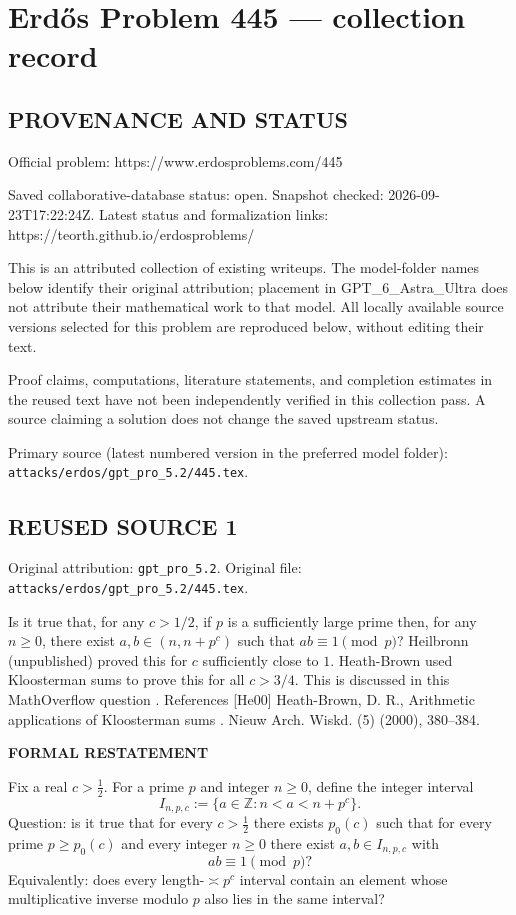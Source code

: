\section*{Erd\H{o}s Problem 445 --- collection record}

\subsection*{PROVENANCE AND STATUS}
Official problem: https://www.erdosproblems.com/445

Saved collaborative-database status: open.
Snapshot checked: 2026-09-23T17:22:24Z.
Latest status and formalization links: https://teorth.github.io/erdosproblems/

This is an attributed collection of existing writeups. The model-folder names below identify their original attribution; placement in GPT\_6\_Astra\_Ultra does not attribute their mathematical work to that model. All locally available source versions selected for this problem are reproduced below, without editing their text.

Proof claims, computations, literature statements, and completion estimates in the reused text have not been independently verified in this collection pass. A source claiming a solution does not change the saved upstream status.

Primary source (latest numbered version in the preferred model folder): \texttt{attacks/erdos/gpt\_pro\_5.2/445.tex}.

\subsection*{REUSED SOURCE 1}
Original attribution: \texttt{gpt\_pro\_5.2}.
Original file: \texttt{attacks/erdos/gpt\_pro\_5.2/445.tex}.


Is it true that, for any $c>1/2$, if $p$ is a sufficiently large prime then, for any $n\geq 0$, there exist $a,b\in(n,n+p^c)$ such that $ab\equiv 1\pmod{p}$? Heilbronn (unpublished) proved this for $c$ sufficiently close to $1$. Heath-Brown \cite{He00} used Kloosterman sums to prove this for all $c>3/4$. This is discussed in this MathOverflow question . References [He00] Heath-Brown, D. R., Arithmetic applications of {K}loosterman sums . Nieuw Arch. Wiskd. (5) (2000), 380--384.


\medskip
\noindent\textbf{FORMAL RESTATEMENT}

Fix a real $c>\tfrac12$. For a prime $p$ and integer $n\ge 0$, define the integer interval
\[
I_{n,p,c}:=\{a\in\mathbb Z: n<a<n+p^c\}.
\]
Question: is it true that for every $c>\tfrac12$ there exists $p_0(c)$ such that for every prime $p\ge p_0(c)$ and every integer $n\ge 0$ there exist $a,b\in I_{n,p,c}$ with
\[
ab\equiv 1\pmod p?
\]
Equivalently: does every length-$\asymp p^c$ interval contain an element whose multiplicative inverse modulo $p$ also lies in the same interval?


